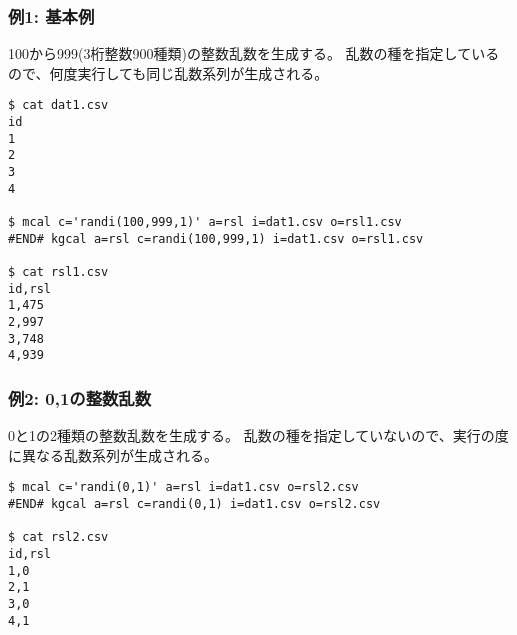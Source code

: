 
\subsubsection*{例1: 基本例}

100から999(3桁整数900種類)の整数乱数を生成する。
乱数の種を指定しているので、何度実行しても同じ乱数系列が生成される。

\begin{Verbatim}[baselinestretch=0.7,frame=single]
$ cat dat1.csv
id
1
2
3
4

$ mcal c='randi(100,999,1)' a=rsl i=dat1.csv o=rsl1.csv
#END# kgcal a=rsl c=randi(100,999,1) i=dat1.csv o=rsl1.csv

$ cat rsl1.csv
id,rsl
1,475
2,997
3,748
4,939
\end{Verbatim}

\subsubsection*{例2: 0,1の整数乱数}

0と1の2種類の整数乱数を生成する。
乱数の種を指定していないので、実行の度に異なる乱数系列が生成される。

\begin{Verbatim}[baselinestretch=0.7,frame=single]
$ mcal c='randi(0,1)' a=rsl i=dat1.csv o=rsl2.csv
#END# kgcal a=rsl c=randi(0,1) i=dat1.csv o=rsl2.csv

$ cat rsl2.csv
id,rsl
1,0
2,1
3,0
4,1
\end{Verbatim}
